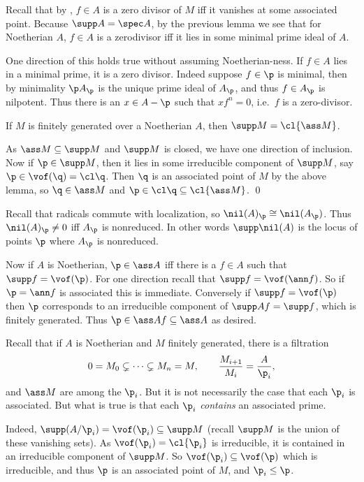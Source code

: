 \eproof

Recall that by , $f\in A$ is a zero divisor of $M$ iff it vanishes at some associated point.
Because $\supp A=\spec A$, by the previous lemma we see that for Noetherian $A$, $f\in A$ is a zerodivisor iff it lies in some minimal prime ideal of $A$.

One direction of this holds true without assuming Noetherian-ness.
If $f\in A$ lies in a minimal prime, it is a zero divisor.
Indeed suppose $f\in\p$ is minimal, then by minimality $\p A_\p$ is the unique prime ideal of $A_\p$, and thus $f\in A_\p$ is nilpotent.
Thus there is an $x\in A-\p$ such that $xf^n=0$, i.e.\ $f$ is a zero-divisor.

\bprop

    If $M$ is finitely generated over a Noetherian $A$, then $\supp M=\cl{\ass M}$.

\eprop

\bproof

    As $\ass M\subseteq\supp M$ and $\supp M$ is closed, we have one direction of inclusion.
    Now if $\p\in\supp M$, then it lies in some irreducible component of $\supp M$, say $\p\in\vof(\q)=\cl\q$.
    Then $\q$ is an associated point of $M$ by the above lemma, so $\q\in\ass M$ and $\p\in\cl\q\subseteq\cl{\ass M}$.
    \qed

\eproof

Recall that radicals commute with localization, so $\nil(A)_\p\cong\nil(A_\p)$.
Thus $\nil(A)_\p\neq0$ iff $A_\p$ is nonreduced.
In other words $\supp\nil(A)$ is the locus of points $\p$ where $A_\p$ is nonreduced.

Now if $A$ is Noetherian, $\p\in\ass A$ iff there is a $f\in A$ such that $\supp f=\vof(\p)$.
For one direction recall that $\supp f=\vof(\ann f)$.
So if $\p=\ann f$ is associated this is immediate.
Conversely if $\supp f=\vof(\p)$ then $\p$ corresponds to an irreducible component of $\supp Af=\supp f$, which is finitely generated.
Thus $\p\in\ass Af\subseteq\ass A$ as desired.

Recall that if $A$ is Noetherian and $M$ finitely generated, there is a filtration
$$ 0 = M_0 \subsetneq \cdots \subsetneq M_n = M,\qquad \frac{M_{i+1}}{M_i} = \frac A{\p_i} , $$
and $\ass M$ are among the $\p_i$.
But it is not necessarily the case that each $\p_i$ is associated.
But what is true is that each $\p_i$ {\it contains\/} an associated prime.

Indeed, $\supp(A/\p_i)=\vof(\p_i)\subseteq\supp M$ (recall $\supp M$ is the union of these vanishing sets).
As $\vof(\p_i)=\cl{\p_i}$ is irreducible, it is contained in an irreducible component of $\supp M$.
So $\vof(\p_i)\subseteq\vof(\p)$ which is irreducible, and thus $\p$ is an associated point of $M$, and $\p_i\leq\p$.

